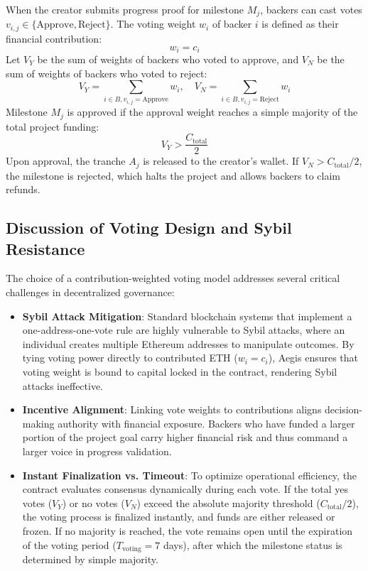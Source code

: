 \documentclass[conference]{IEEEtran}
\begin{document}
When the creator submits progress proof for milestone $M_j$, backers can cast votes $v_{i,j} \in \{\text{Approve}, \text{Reject}\}$. The voting weight $w_i$ of backer $i$ is defined as their financial contribution:
\begin{equation}
w_i = c_i
\end{equation}
Let $V_Y$ be the sum of weights of backers who voted to approve, and $V_N$ be the sum of weights of backers who voted to reject:
\begin{equation}
V_Y = \sum_{i \in B, v_{i,j} = \text{Approve}} w_i, \quad V_N = \sum_{i \in B, v_{i,j} = \text{Reject}} w_i
\end{equation}
Milestone $M_j$ is approved if the approval weight reaches a simple majority of the total project funding:
\begin{equation}
V_Y > \frac{C_{\text{total}}}{2}
\end{equation}
Upon approval, the tranche $A_j$ is released to the creator's wallet. If $V_N > C_{\text{total}}/2$, the milestone is rejected, which halts the project and allows backers to claim refunds.

\subsection{Discussion of Voting Design and Sybil Resistance}
The choice of a contribution-weighted voting model addresses several critical challenges in decentralized governance:
\begin{itemize}
	\item \textbf{Sybil Attack Mitigation}: Standard blockchain systems that implement a one-address-one-vote rule are highly vulnerable to Sybil attacks, where an individual creates multiple Ethereum addresses to manipulate outcomes. By tying voting power directly to contributed ETH ($w_i = c_i$), Aegis ensures that voting weight is bound to capital locked in the contract, rendering Sybil attacks ineffective.
	\item \textbf{Incentive Alignment}: Linking vote weights to contributions aligns decision-making authority with financial exposure. Backers who have funded a larger portion of the project goal carry higher financial risk and thus command a larger voice in progress validation.
	\item \textbf{Instant Finalization vs. Timeout}: To optimize operational efficiency, the contract evaluates consensus dynamically during each vote. If the total yes votes ($V_Y$) or no votes ($V_N$) exceed the absolute majority threshold ($C_{\text{total}}/2$), the voting process is finalized instantly, and funds are either released or frozen. If no majority is reached, the vote remains open until the expiration of the voting period ($T_{\text{voting}} = 7$ days), after which the milestone status is determined by simple majority.
\end{itemize}
\end{document}
